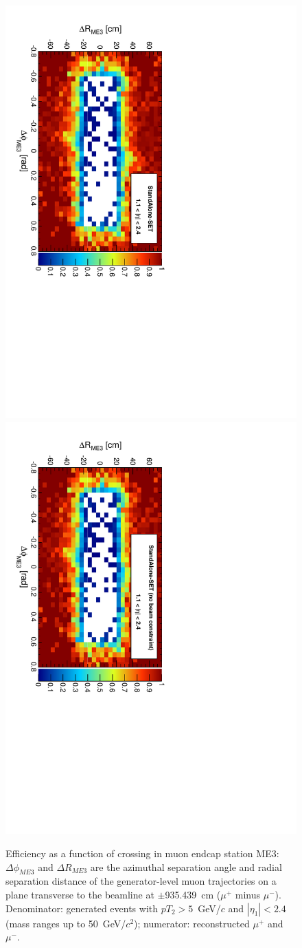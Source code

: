\documentclass[12pt]{article}
\begin{document}
\begin{figure}[p]
\includegraphics[height=0.5\linewidth, angle=90]{fig/acceptance7_plot/me3_StandAloneUpdatedSET.pdf}
\includegraphics[height=0.5\linewidth, angle=90]{fig/acceptance7_plot/me3_StandAloneSET.pdf}

\caption{Efficiency as a function of crossing in muon endcap station
  ME3: $\Delta\phi_{ME3}$ and $\Delta R_{ME3}$ are the azimuthal
  separation angle and radial separation distance of the
  generator-level muon trajectories on a plane transverse to the
  beamline at $\pm$935.439~cm ($\mu^+$ minus $\mu^-$).  Denominator:
  generated events with $pT_2 > 5$~GeV/$c$ and $|\eta_1| < 2.4$ (mass
  ranges up to 50~GeV/$c^2$); numerator: reconstructed $\mu^+$ and
  $\mu^-$. \label{fig:me3}}
\end{figure}
\end{document}
